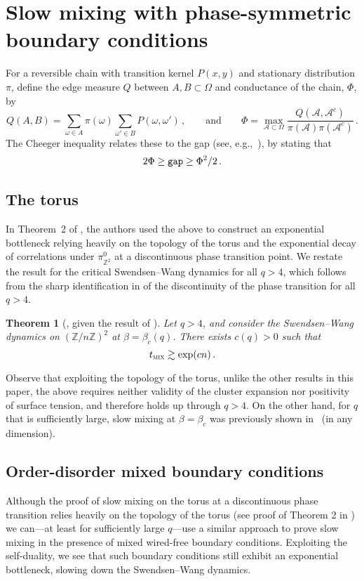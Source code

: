 \documentclass[reqno,11pt]{amsart}
\numberwithin{equation}{section}
\newtheorem{theorem}{Theorem}[section]
\theoremstyle{definition}{
\newtheorem{example}[theorem]{Example}
\newtheorem{definition}[theorem]{Definition}
\newtheorem*{definition*}{Definition}
\newtheorem{problem}[theorem]{Problem}
\newtheorem{question}[theorem]{Question}
\newtheorem{remark}[theorem]{Remark}
}
\newcommand{\tmix}{t_{\textsc{mix}}}
\newcommand{\gap}{\text{\tt{gap}}}
\begin{document}
\section{Slow mixing with phase-symmetric boundary conditions}\label{sec:slow-mixing}
For a reversible chain with transition kernel $P(x,y)$ and stationary distribution $\pi$, define the edge measure $Q$ between $A,B\subset\Omega$ and conductance of the chain, $\Phi$, by
\[Q(A,B)=\sum _{\omega\in A} \pi(\omega)\sum_{\omega'\in B}P(\omega,\omega')\,,\qquad \mbox{and}\qquad \Phi=\max_{\mathcal A\subset \Omega}\frac {Q(\mathcal A,\mathcal A^c)}{\pi(\mathcal A)\pi(\mathcal A^c)}\,.
\]
The Cheeger inequality relates these to the gap  (see, e.g.,~\cite[\S7]{LPW17}), by stating that 
\begin{align}\label{eq:Cheeger-constant}
2\Phi\geq \gap \geq  {\Phi^2}/{2}\,.
\end{align}


\subsection*{The torus}
In Theorem~2 of \cite{GL16a}, the authors used the above to construct an exponential bottleneck relying heavily on the topology of the torus and the exponential decay of correlations under $\pi^{0}_{\mathbb Z^2}$ at a discontinuous phase transition point. We restate the result for the critical Swendsen--Wang dynamics for all $q>4$, which follows from the sharp identification in \cite{DGHMT16} of the discontinuity of the phase transition for all $q>4$.  

\begin{theorem}[{\cite[Theorem 3]{GL16a}}, given the result of \cite{DGHMT16}]\label{thm:torus}
Let $q>4$, and consider the Swendsen--Wang dynamics on $(\mathbb Z/n \mathbb Z)^2$ at $\beta= \beta_c(q)$. There exists $c(q)>0$ such that
\[\tmix\gtrsim \exp(cn)\,.
\]
\end{theorem}

\noindent Observe that exploiting the topology of the torus, unlike the other results in this paper, the above requires neither validity of the cluster expansion nor positivity of surface tension, and therefore holds up through $q>4$. On the other hand, for $q$ that is sufficiently large, slow mixing at $\beta=\beta_c$ was previously shown in~\cite{BCT12} (in any dimension).

\subsection*{Order-disorder mixed boundary conditions}
Although the proof of slow mixing on the torus at a discontinuous phase transition relies heavily on the topology of the torus (see proof of Theorem 2 in \cite{GL16a}) we can---at least for sufficiently large $q$---use a similar approach to prove slow mixing in the presence of mixed wired-free boundary conditions. Exploiting the self-duality, we see that such boundary conditions still exhibit an exponential bottleneck, slowing down the Swendsen--Wang dynamics.
\end{document}
